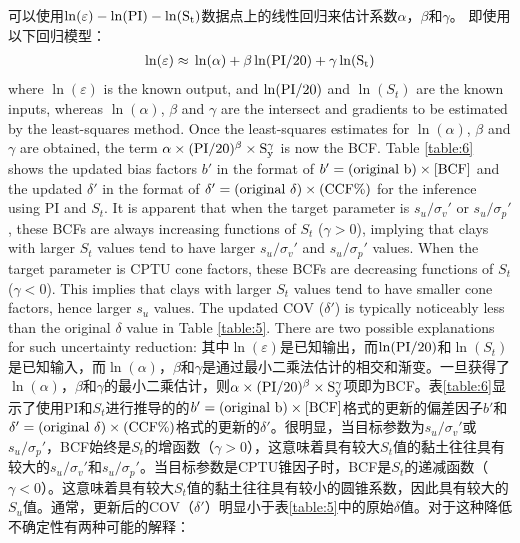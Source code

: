    \ParallelRText
    {
        可以使用$\ln(\varepsilon)-\ln(\rm{PI})-\ln(S_t)$数据点上的线性回归来估计系数$\alpha$，$\beta$和$\gamma$。 即使用以下回归模型：
    }
    \ParallelPar
    \begin{align}
        \ln(\varepsilon)\approx{}\ln(\alpha)+\beta\ln(\rm{PI}/20)+\gamma\ln(S_t)
        \label{equation:9}
    \end{align}
    \ParallelLText
    {
        where $\ln(\varepsilon)$ is the known output, and $\ln(\rm{PI}/20)$ and $\ln(S_t)$ are the known inputs, whereas $\ln(\alpha)$, $\beta$ and $\gamma$ are the intersect and gradients to be estimated by the least-squares method. Once the least-squares estimates for $\ln(\alpha)$, $\beta$ and $\gamma$ are obtained, the term $\alpha\times{}(\rm{PI}/20)^\beta\times{}S_y^\gamma$ is now the BCF. Table \ref{table:6} shows the updated bias factors $b'$ in the format of $b'=(\rm{original}~b)\times{}[BCF]$ and the updated $\delta'$ in the format of $\delta'=(\rm{original}~\delta)\times{}(\rm{CCF}\%)$ for the inference using PI and $S_t$. It is apparent that when the target parameter is $s_u/\sigma_v'$ or $s_u/\sigma_p'$, these BCFs are always increasing functions of $S_t$ ($\gamma>0$), implying that clays with larger $S_t$ values tend to have larger $s_u/\sigma_v'$ and $s_u/\sigma_p'$ values. When the target parameter is CPTU cone factors, these BCFs are decreasing functions of $S_t$ ($\gamma<0$). This implies that clays with larger $S_t$ values tend to have smaller cone factors, hence larger $s_u$ values. The updated COV ($\delta'$) is typically noticeably less than the original $\delta$ value in Table \ref{table:5}. There are two possible explanations for such uncertainty reduction:
    }
    \ParallelRText
    {
        其中$\ln(\varepsilon)$是已知输出，而$\ln(\rm{PI}/20)$和$\ln(S_t)$是已知输入，而$\ln(\alpha)$，$\beta$和$\gamma$是通过最小二乘法估计的相交和渐变。一旦获得了$\ln(\alpha)$，$\beta$和$\gamma$的最小二乘估计，则$\alpha\times{}(\rm{PI}/20)^\beta\times{}S_y^\gamma$项即为BCF。表\ref{table:6}显示了使用PI和$S_t$进行推导的的$b'=(\rm{original}~b)\times{}[BCF]$格式的更新的偏差因子$b'$和$\delta'=(\rm{original}~\delta)\times{}(\rm{CCF}\%)$格式的更新的$\delta'$。很明显，当目标参数为$s_u/\sigma_v'$或$s_u/\sigma_p'$，BCF始终是$S_t$的增函数（$\gamma>0$），这意味着具有较大$S_t$值的黏土往往具有较大的$s_u/\sigma_v'$和$s_u/\sigma_p'$。当目标参数是CPTU锥因子时，BCF是$S_t$的递减函数（$\gamma<0$）。这意味着具有较大$S_t$值的黏土往往具有较小的圆锥系数，因此具有较大的$S_u$值。通常，更新后的COV（$\delta'$）明显小于表\ref{table:5}中的原始$\delta$值。对于这种降低不确定性有两种可能的解释：
    }
